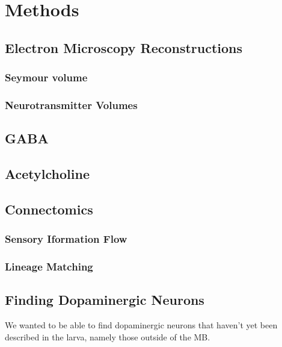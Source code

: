 
\chapter{Methods}



\section{Electron Microscopy Reconstructions}
\subsection{Seymour volume}
\subsection{Neurotransmitter Volumes}
\section*{GABA}
\section*{Acetylcholine}

\section{Connectomics}
\subsection{Sensory Iformation Flow}
\subsection{Lineage Matching}


\section{Finding Dopaminergic Neurons}
We wanted to be able to find dopaminergic neurons that haven't yet been described in the larva, namely those outside of the MB.  


